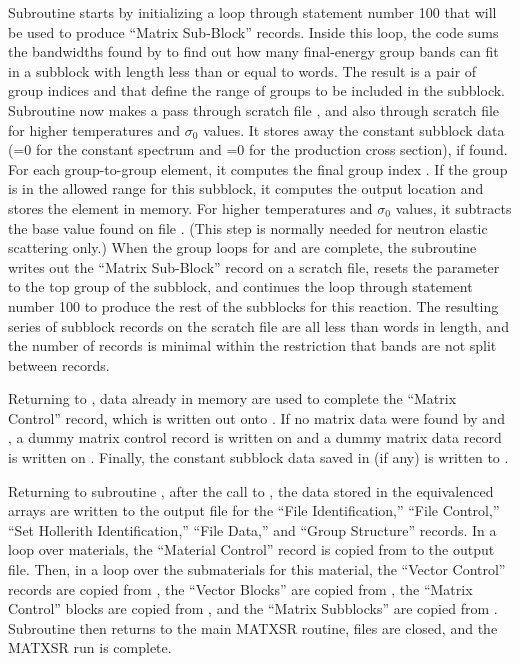 Subroutine  starts by
initializing a loop through statement number 100 that will be used
to produce ``Matrix Sub-Block'' records.  Inside this loop, the
code sums the bandwidths found by 
to find out how many final-energy group bands can fit in
a subblock with length less than or equal to  words.  The
result is a pair of group indices  and  that
define the range of groups to be included in the subblock.  Subroutine
 now makes a pass through scratch file , and
also through scratch file  for higher temperatures and
$\sigma_0$ values.  It stores away the constant subblock data
(=0 for the constant spectrum and =0 for the
production cross section), if found.  For each group-to-group element,
it computes the final group index .  If the group is in the
allowed range for this subblock, it computes the output location
 and stores the element in memory.  For higher temperatures
and $\sigma_0$ values, it subtracts the base value found on file
.  (This step is normally needed for neutron elastic
scattering only.) When the group loops for  and 
are complete, the subroutine writes out the ``Matrix Sub-Block'' record
on a scratch file, resets the  parameter to the top group
of the subblock, and continues the loop through statement number 100 to
produce the rest of the subblocks for this reaction.  The resulting
series of subblock records on the scratch file are all less than
 words in length, and the number of records is minimal
within the restriction that bands are not split between records.

Returning to , data already in memory are used to complete
the ``Matrix Control'' record, which is written out onto .
If no matrix data were found by  and , a dummy
matrix control record is written on  and a dummy matrix
data record is written on .  Finally, the constant subblock
data saved in  (if any) is written to .

Returning to subroutine , after the call to ,
the data stored in the  equivalenced arrays are
written to the output file for the ``File Identification,''
``File Control,'' ``Set Hollerith Identification,'' ``File Data,''
and ``Group Structure'' records.  In a loop over materials, the
``Material Control'' record is copied from  to the output
file.  Then, in a loop over the submaterials for this material, the
``Vector Control'' records are copied from , the
``Vector Blocks'' are copied from , the ``Matrix
Control'' blocks are copied from , and the ``Matrix
Subblocks'' are copied from .  Subroutine 
then returns to the main MATXSR
routine, files are closed, and the
MATXSR run is complete.

